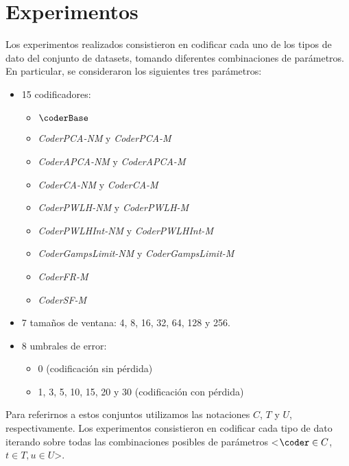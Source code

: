\section{Experimentos}
\label{secX:experimentos}
Los experimentos realizados consistieron en codificar cada uno de los tipos de dato del conjunto de datasets, tomando diferentes combinaciones de parámetros. En particular, se consideraron los siguientes tres parámetros:
\vspace{-8pt}
\begin{itemize}
    \item 15 codificadores: 
        \vspace{-5pt}
        \begin{itemize}
            \item $\coderBase$
            \item \textit{CoderPCA-NM} y \textit{CoderPCA-M}
            \item \textit{CoderAPCA-NM} y \textit{CoderAPCA-M}
            \item \textit{CoderCA-NM} y \textit{CoderCA-M}
            \item \textit{CoderPWLH-NM} y \textit{CoderPWLH-M}
            \item \textit{CoderPWLHInt-NM} y \textit{CoderPWLHInt-M}
            \item \textit{CoderGampsLimit-NM} y \textit{CoderGampsLimit-M}
            \item \textit{CoderFR-M}
            \item \textit{CoderSF-M}
        \end{itemize}
    \item 7 tamaños de ventana: 4, 8, 16, 32, 64, 128 y 256.
    \item 8 umbrales de error: 
        \vspace{-5pt}
        \begin{itemize}
            \item 0 (codificación sin pérdida)
            \item 1, 3, 5, 10, 15, 20 y 30 (codificación con pérdida)
        \end{itemize}
\end{itemize}

\vspace{+5pt}
Para referirnos a estos conjuntos utilizamos las notaciones $C$, $T$ y $U$, respectivamente. Los experimentos consistieron en codificar cada tipo de dato iterando sobre todas las combinaciones posibles de parámetros <$\coder \in C$, $t \in T, u \in U$>.

